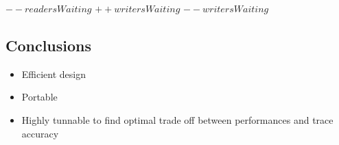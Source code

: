 \begin{itemize}
\begin{algorithm}[htb]
\begin{algorithmic}[1]
                \State $--readersWaiting$
            \EndFunction
                \State {}
            \EndFunction
                    \State {}
                \EndWhile
                \State $++writersWaiting$
                \State {}
                \State $--writersWaiting$
            \EndFunction
                \State {}
            \EndFunction
            \end{algorithmic}
        \end{algorithm}
\end{itemize}

\subsection{Conclusions}

\begin{itemize}
    \item Efficient design
    \item Portable
    \item Highly tunnable to find optimal trade off between performances and
        trace accuracy
\end{itemize}
